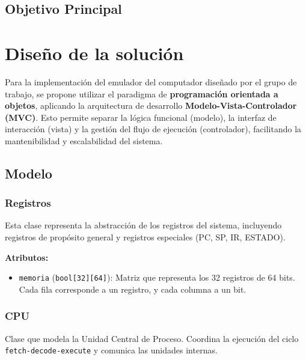 \documentclass{article}
\begin{document}
\subsection{Objetivo Principal}




\section{Diseño de la solución}\label{sec:dis}

Para la implementación del emulador del computador diseñado por el grupo de trabajo, se propone
utilizar el paradigma de \textbf{programación orientada a objetos}, aplicando la arquitectura de
desarrollo \textbf{Modelo-Vista-Controlador (MVC)}. Esto permite separar la lógica funcional
(modelo), la interfaz de interacción (vista) y la gestión del flujo de ejecución (controlador),
facilitando la mantenibilidad y escalabilidad del sistema.

\subsection{Modelo}

\subsubsection*{Registros}

Esta clase representa la abstracción de los registros del sistema, incluyendo registros de
propósito general y registros especiales (PC, SP, IR, ESTADO).

\textbf{Atributos:}
\begin{itemize}
  \item \texttt{memoria} (\texttt{bool[32][64]}): Matriz que representa los 32 registros
        de 64 bits. Cada fila corresponde a un registro, y cada columna a un bit.
\end{itemize}

\subsubsection*{CPU}

Clase que modela la Unidad Central de Proceso. Coordina la ejecución del ciclo
\texttt{fetch-decode-execute} y comunica las unidades internas.
\end{document}
